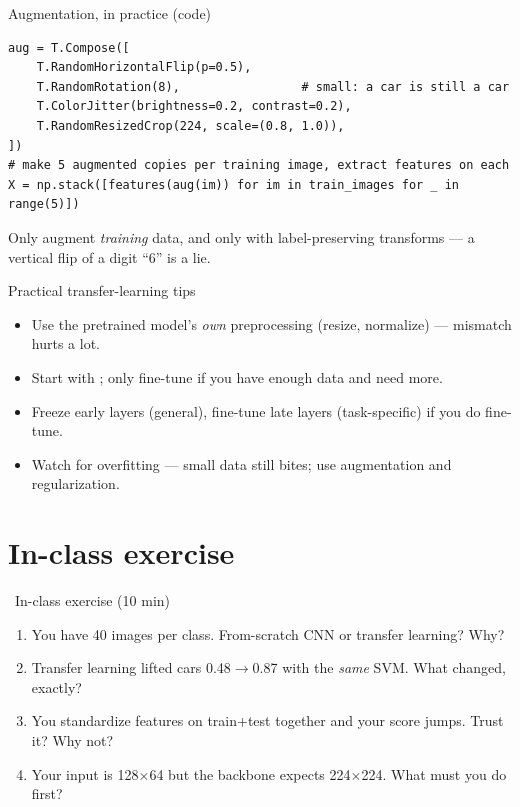 \documentclass[10pt,aspectratio=169]{beamer}
\begin{document}
\begin{frame}[fragile]{Augmentation, in practice (code)}
\begin{lstlisting}
aug = T.Compose([
    T.RandomHorizontalFlip(p=0.5),
    T.RandomRotation(8),                 # small: a car is still a car
    T.ColorJitter(brightness=0.2, contrast=0.2),
    T.RandomResizedCrop(224, scale=(0.8, 1.0)),
])
# make 5 augmented copies per training image, extract features on each
X = np.stack([features(aug(im)) for im in train_images for _ in range(5)])
\end{lstlisting}
  \begin{badbox}
    Only augment \emph{training} data, and only with label-preserving transforms — a vertical
    flip of a digit ``6'' is a lie.
  \end{badbox}
\end{frame}

\begin{frame}{Practical transfer-learning tips}
  \begin{itemize}
    \item Use the pretrained model's \emph{own} preprocessing (resize, normalize) — mismatch hurts a lot.
    \item Start with ; only fine-tune if you have enough data and need more.
    \item Freeze early layers (general), fine-tune late layers (task-specific) if you do fine-tune.
    \item Watch for overfitting — small data still bites; use augmentation and regularization.
  \end{itemize}
\end{frame}

\section{In-class exercise}

\begin{frame}{\faPen~In-class exercise (10 min)}
  \begin{infobox}
  \end{infobox}
  \begin{enumerate}
    \item You have 40 images per class. From-scratch CNN or transfer learning? Why?
    \item Transfer learning lifted cars 0.48$\rightarrow$0.87 with the \emph{same} SVM. What changed, exactly?
    \item You standardize features on train+test together and your score jumps. Trust it? Why not?
    \item Your input is 128$\times$64 but the backbone expects 224$\times$224. What must you do first?
  \end{enumerate}
\end{frame}
\end{document}
